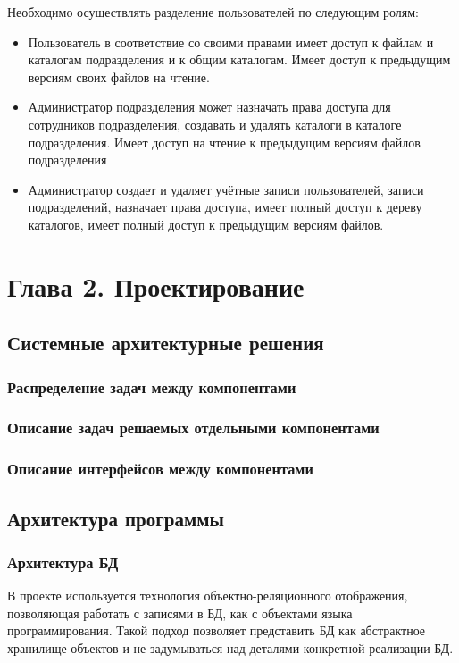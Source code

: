 \documentclass[utf8,usehyperref,12pt]{G7-32}
\begin{document}
Необходимо осуществлять разделение пользователей по следующим ролям:	
\begin{itemize}
\item Пользователь 	в соответствие со своими правами имеет 	доступ к файлам и каталогам подразделения и к общим каталогам. Имеет доступ к предыдущим версиям своих файлов на чтение. 		
\item Администратор подразделения может назначать права 	доступа для сотрудников подразделения, создавать и удалять каталоги в каталоге подразделения. Имеет доступ на чтение к предыдущим версиям файлов подразделения	
\item Администратор создает и удаляет учётные записи пользователей, записи подразделений, назначает права доступа, имеет полный 	доступ к дереву каталогов, имеет полный 	доступ к предыдущим версиям файлов.
\end{itemize}

\chapter{Глава 2. Проектирование}
\section{Системные архитектурные решения}
\subsection{Распределение задач между компонентами}

\subsection{Описание задач решаемых отдельными компонентами}
\subsection{Описание интерфейсов между компонентами}

\section{Архитектура программы}
\subsection{Архитектура БД}

В проекте используется технология объектно-реляционного отображения, позволяющая работать с записями в БД, как с объектами языка программирования. Такой подход позволяет представить БД как абстрактное хранилище объектов и не задумываться над деталями конкретной реализации БД.
\end{document}
